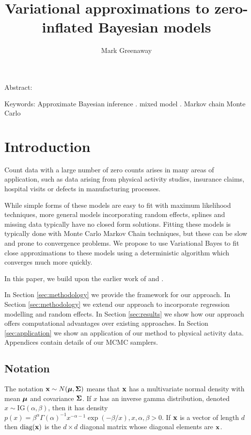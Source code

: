 \documentclass{article}[12pt]
\title{Variational approximations to zero-inflated Bayesian models}
\author{Mark Greenaway}
\begin{document}
\maketitle

Abstract:

Keywords: Approximate Bayesian inference . mixed model . Markov chain Monte Carlo

\section{Introduction}

\noindent Count data with a large number of zero counts arises in many areas of
application, such as data arising from physical activity studies, 
insurance claims, hospital visits or defects in manufacturing processes.

\noindent While simple forms of these models are easy to fit with maximum likelihood techniques,
more general models incorporating random effects, splines and missing data typically
have no closed form solutions. Fitting these models is typically done with Monte Carlo
Markov Chain techniques, but these can be slow and prone to convergence problems. We
propose to use Variational Bayes to fit close approximations to these models
using a deterministic algorithm which converges much more quickly.


\noindent In this paper, we build upon the earlier work of \cite{lambert1992} and \cite{Ghosh20061360}.

\noindent In Section \ref{sec:methodology} we provide the framework for our approach. In
Section \ref{sec:methodology} we extend our approach to incorporate regression modelling
and random effects. In Section \ref{sec:results} we show how our approach offers 
computational advantages over existing approaches. In Section \ref{sec:application} we 
show an application of our method to physical activity data. Appendices contain details 
of our MCMC samplers.

\subsection{Notation}

The notation ${\bf x} \sim N({\boldsymbol \mu}, {\boldsymbol \Sigma})$ means that ${\bf x}$ has a multivariate normal
density with mean ${\boldsymbol \mu}$ and covariance ${\boldsymbol \Sigma}$. If $x$ has an inverse gamma
distribution, denoted $x \sim \mbox{IG}(\alpha, \beta)$, then it has density
$p(x) = \beta^\alpha \Gamma(\alpha)^{-1}x^{-\alpha-1} \exp{(-\beta/x)}, x, \alpha,
\beta > 0$.
If ${\bf x}$ is a vector of length $d$ then $\mbox{diag}({\bf x})$ is the $d \times d$
diagonal matrix whose diagonal elements are ${\bf x}$.
\end{document}
